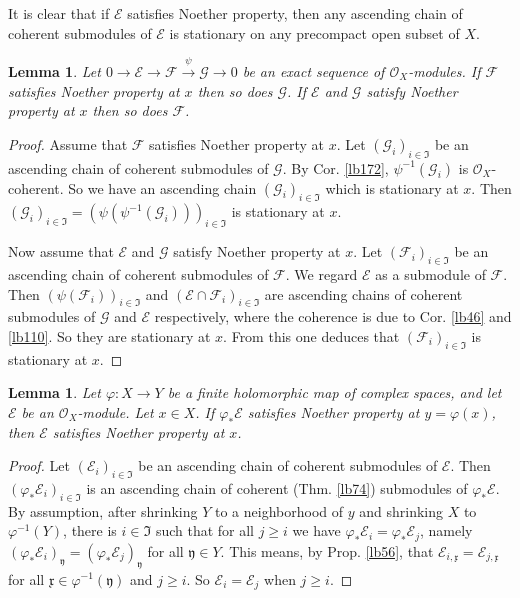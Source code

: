\documentclass[12pt,b5paper,notitlepage]{report}
\theoremstyle{definition}
\theoremstyle{plain}
\newtheorem{lm}[df]{Lemma}
\newcommand{\fk}{\mathfrak}
\newcommand{\scr}{\mathscr}
\newcommand{\xk}{\mathfrak x}
\newcommand{\yk}{\mathfrak y}
\numberwithin{equation}{section}
\begin{document}
It is clear that if $\scr E$ satisfies Noether property, then any ascending chain of coherent submodules of $\scr E$ is stationary on any precompact open subset of $X$.


\begin{lm}\label{lb175}
Let $0\rightarrow\scr E\rightarrow\scr F\xrightarrow{\psi}\scr G\rightarrow0$ be an exact sequence of $\scr O_X$-modules. If $\scr F$ satisfies Noether property at $x$ then so does $\scr G$. If $\scr E$ and $\scr G$ satisfy Noether property at $x$ then so does $\scr F$.
\end{lm}


\begin{proof}
Assume that $\scr F$ satisfies Noether property at $x$. Let $(\scr G_i)_{i\in\fk I}$ be an ascending chain of coherent submodules of $\scr G$. By Cor. \ref{lb172}, $\psi^{-1}(\scr G_i)$ is $\scr O_X$-coherent. So we have an ascending chain $(\scr G_i)_{i\in\fk I}$ which is stationary at $x$. Then $(\scr G_i)_{i\in\fk I}=(\psi(\psi^{-1}(\scr G_i)))_{i\in\fk I}$ is stationary at $x$.

Now assume that $\scr E$ and $\scr G$ satisfy Noether property at $x$. Let $(\scr F_i)_{i\in\fk I}$ be an ascending chain of coherent submodules of $\scr F$. We regard $\scr E$ as a submodule of $\scr F$. Then $(\psi(\scr F_i))_{i\in\fk I}$ and $(\scr E\cap\scr F_i)_{i\in\fk I}$ are ascending chains of coherent submodules of $\scr G$ and $\scr E$ respectively, where the coherence is due to Cor. \ref{lb46} and \ref{lb110}. So they are stationary at $x$. From this one deduces that $(\scr F_i)_{i\in\fk I}$ is stationary at $x$.
\end{proof}


\begin{lm}\label{lb174}
Let $\varphi:X\rightarrow Y$ be a finite holomorphic map of complex spaces, and let $\scr E$ be an $\scr O_X$-module. Let $x\in X$. If $\varphi_*\scr E$ satisfies Noether property at $y=\varphi(x)$, then $\scr E$ satisfies Noether property at $x$. 
\end{lm}


\begin{proof}
Let $(\scr E_i)_{i\in\fk I}$ be an ascending chain of coherent submodules of $\scr E$. Then $(\varphi_*\scr E_i)_{i\in\fk I}$ is an ascending chain of coherent (Thm. \ref{lb74})  submodules of $\varphi_*\scr E$. By assumption, after shrinking $Y$ to a neighborhood of $y$ and shrinking $X$ to $\varphi^{-1}(Y)$, there is $i\in\fk I$ such that for all  $j\geq i$ we have $\varphi_*\scr E_i=\varphi_*\scr E_j$, namely $(\varphi_*\scr E_i)_\yk=(\varphi_*\scr E_j)_\yk$ for all $\yk\in Y$. This means, by Prop. \ref{lb56}, that $\scr E_{i,\xk}=\scr E_{j,\xk}$ for all $\xk\in\varphi^{-1}(\yk)$ and $j\geq i$. So $\scr E_i=\scr E_j$ when $j\geq i$.
\end{proof}
\end{document}
